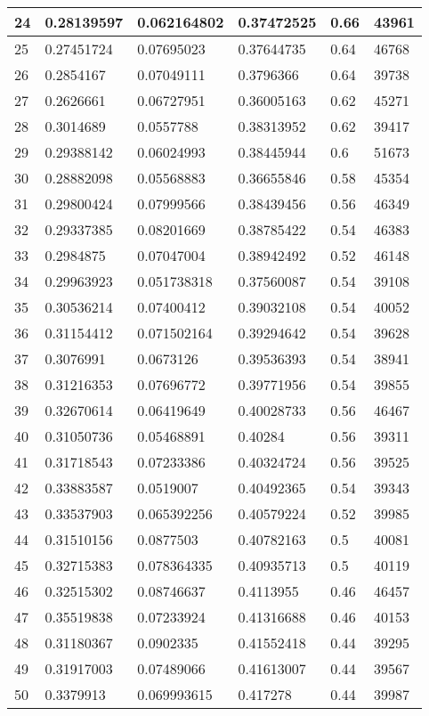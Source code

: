 \begin{longtable}{|l|l|l|l|l|l|}
24 & 0.28139597 & 0.062164802 & 0.37472525 & 0.66 & 43961 \\ \hline 
25 & 0.27451724 & 0.07695023 & 0.37644735 & 0.64 & 46768 \\ \hline 
26 & 0.2854167 & 0.07049111 & 0.3796366 & 0.64 & 39738 \\ \hline 
27 & 0.2626661 & 0.06727951 & 0.36005163 & 0.62 & 45271 \\ \hline 
28 & 0.3014689 & 0.0557788 & 0.38313952 & 0.62 & 39417 \\ \hline 
29 & 0.29388142 & 0.06024993 & 0.38445944 & 0.6 & 51673 \\ \hline 
30 & 0.28882098 & 0.05568883 & 0.36655846 & 0.58 & 45354 \\ \hline 
31 & 0.29800424 & 0.07999566 & 0.38439456 & 0.56 & 46349 \\ \hline 
32 & 0.29337385 & 0.08201669 & 0.38785422 & 0.54 & 46383 \\ \hline 
33 & 0.2984875 & 0.07047004 & 0.38942492 & 0.52 & 46148 \\ \hline 
34 & 0.29963923 & 0.051738318 & 0.37560087 & 0.54 & 39108 \\ \hline 
35 & 0.30536214 & 0.07400412 & 0.39032108 & 0.54 & 40052 \\ \hline 
36 & 0.31154412 & 0.071502164 & 0.39294642 & 0.54 & 39628 \\ \hline 
37 & 0.3076991 & 0.0673126 & 0.39536393 & 0.54 & 38941 \\ \hline 
38 & 0.31216353 & 0.07696772 & 0.39771956 & 0.54 & 39855 \\ \hline 
39 & 0.32670614 & 0.06419649 & 0.40028733 & 0.56 & 46467 \\ \hline 
40 & 0.31050736 & 0.05468891 & 0.40284 & 0.56 & 39311 \\ \hline 
41 & 0.31718543 & 0.07233386 & 0.40324724 & 0.56 & 39525 \\ \hline 
42 & 0.33883587 & 0.0519007 & 0.40492365 & 0.54 & 39343 \\ \hline 
43 & 0.33537903 & 0.065392256 & 0.40579224 & 0.52 & 39985 \\ \hline 
44 & 0.31510156 & 0.0877503 & 0.40782163 & 0.5 & 40081 \\ \hline 
45 & 0.32715383 & 0.078364335 & 0.40935713 & 0.5 & 40119 \\ \hline 
46 & 0.32515302 & 0.08746637 & 0.4113955 & 0.46 & 46457 \\ \hline 
47 & 0.35519838 & 0.07233924 & 0.41316688 & 0.46 & 40153 \\ \hline 
48 & 0.31180367 & 0.0902335 & 0.41552418 & 0.44 & 39295 \\ \hline 
49 & 0.31917003 & 0.07489066 & 0.41613007 & 0.44 & 39567 \\ \hline 
50 & 0.3379913 & 0.069993615 & 0.417278 & 0.44 & 39987 \\ \hline 
\end{longtable}